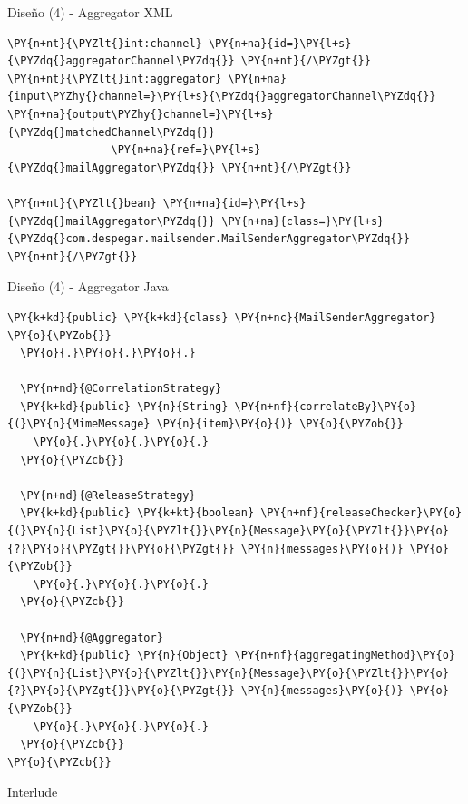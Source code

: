 \documentclass{beamer}
\begin{document}
\begin{frame}[fragile]{Diseño (4) - Aggregator XML}
\begin{Verbatim}[fontsize=\tiny,commandchars=\\\{\}]
\PY{n+nt}{\PYZlt{}int:channel} \PY{n+na}{id=}\PY{l+s}{\PYZdq{}aggregatorChannel\PYZdq{}} \PY{n+nt}{/\PYZgt{}}
\PY{n+nt}{\PYZlt{}int:aggregator} \PY{n+na}{input\PYZhy{}channel=}\PY{l+s}{\PYZdq{}aggregatorChannel\PYZdq{}} \PY{n+na}{output\PYZhy{}channel=}\PY{l+s}{\PYZdq{}matchedChannel\PYZdq{}} 
                \PY{n+na}{ref=}\PY{l+s}{\PYZdq{}mailAggregator\PYZdq{}} \PY{n+nt}{/\PYZgt{}}

\PY{n+nt}{\PYZlt{}bean} \PY{n+na}{id=}\PY{l+s}{\PYZdq{}mailAggregator\PYZdq{}} \PY{n+na}{class=}\PY{l+s}{\PYZdq{}com.despegar.mailsender.MailSenderAggregator\PYZdq{}} \PY{n+nt}{/\PYZgt{}}
\end{Verbatim}
\end{frame}

\begin{frame}[fragile]{Diseño (4) - Aggregator Java}
\begin{Verbatim}[fontsize=\tiny,commandchars=\\\{\}]
\PY{k+kd}{public} \PY{k+kd}{class} \PY{n+nc}{MailSenderAggregator} \PY{o}{\PYZob{}}
  \PY{o}{.}\PY{o}{.}\PY{o}{.}

  \PY{n+nd}{@CorrelationStrategy}
  \PY{k+kd}{public} \PY{n}{String} \PY{n+nf}{correlateBy}\PY{o}{(}\PY{n}{MimeMessage} \PY{n}{item}\PY{o}{)} \PY{o}{\PYZob{}}
    \PY{o}{.}\PY{o}{.}\PY{o}{.}
  \PY{o}{\PYZcb{}}

  \PY{n+nd}{@ReleaseStrategy}
  \PY{k+kd}{public} \PY{k+kt}{boolean} \PY{n+nf}{releaseChecker}\PY{o}{(}\PY{n}{List}\PY{o}{\PYZlt{}}\PY{n}{Message}\PY{o}{\PYZlt{}}\PY{o}{?}\PY{o}{\PYZgt{}}\PY{o}{\PYZgt{}} \PY{n}{messages}\PY{o}{)} \PY{o}{\PYZob{}}
    \PY{o}{.}\PY{o}{.}\PY{o}{.}
  \PY{o}{\PYZcb{}}

  \PY{n+nd}{@Aggregator}
  \PY{k+kd}{public} \PY{n}{Object} \PY{n+nf}{aggregatingMethod}\PY{o}{(}\PY{n}{List}\PY{o}{\PYZlt{}}\PY{n}{Message}\PY{o}{\PYZlt{}}\PY{o}{?}\PY{o}{\PYZgt{}}\PY{o}{\PYZgt{}} \PY{n}{messages}\PY{o}{)} \PY{o}{\PYZob{}}
    \PY{o}{.}\PY{o}{.}\PY{o}{.}
  \PY{o}{\PYZcb{}}
\PY{o}{\PYZcb{}}
\end{Verbatim}
\end{frame}

\begin{frame}{Interlude}
\end{frame}
\end{document}
